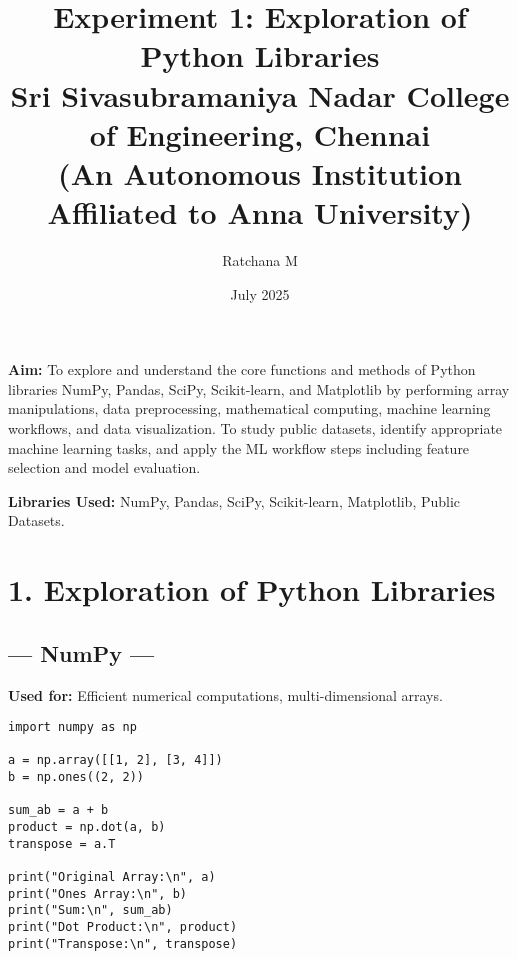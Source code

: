 \documentclass[11pt]{article}
\title{
    \textbf{Experiment 1: Exploration of Python Libraries} \\
    \large Sri Sivasubramaniya Nadar College of Engineering, Chennai \\
    \normalsize (An Autonomous Institution Affiliated to Anna University)
}
\author{Ratchana M}
\date{July 2025}
\begin{document}
\maketitle

\begin{table}[H]
\renewcommand{\arraystretch}{1.5}
\end{table}

\noindent
\textbf{Aim:} To explore and understand the core functions and methods of Python libraries NumPy, Pandas, SciPy, Scikit-learn, and Matplotlib by performing array manipulations, data preprocessing, mathematical computing, machine learning workflows, and data visualization. To study public datasets, identify appropriate machine learning tasks, and apply the ML workflow steps including feature selection and model evaluation.

\vspace{0.3cm}
\noindent
\textbf{Libraries Used:} NumPy, Pandas, SciPy, Scikit-learn, Matplotlib, Public Datasets.

\vspace{0.5cm}
\section*{1. Exploration of Python Libraries}

\subsection*{--- NumPy ---}
\textbf{Used for:} Efficient numerical computations, multi-dimensional arrays.
\begin{lstlisting}
import numpy as np

a = np.array([[1, 2], [3, 4]])
b = np.ones((2, 2))

sum_ab = a + b
product = np.dot(a, b)
transpose = a.T

print("Original Array:\n", a)
print("Ones Array:\n", b)
print("Sum:\n", sum_ab)
print("Dot Product:\n", product)
print("Transpose:\n", transpose)
\end{lstlisting}
\end{document}
